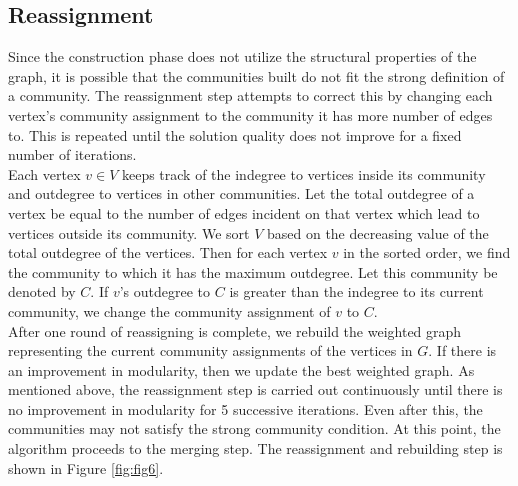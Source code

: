 \begin{spacing}{1.5}
\subsection{Reassignment}
Since the construction phase does not utilize the structural properties of the graph, it is possible that the communities built do not fit the strong definition of a community. The reassignment step attempts to correct this by changing each vertex's community assignment to the community it has more number of edges to. This is repeated until the solution quality does not improve for a fixed number of iterations.\\
\indent Each vertex $v\in V$ keeps track of the indegree to vertices inside its community and outdegree to vertices in other communities. Let the total outdegree of a vertex be equal to the number of edges incident on that vertex which lead to vertices outside its community. We sort $V$ based on the decreasing value of the total outdegree of the vertices. Then for each vertex $v$ in the sorted order, we find the community to which it has the maximum outdegree. Let this community be denoted by $C$. If $v$'s outdegree to $C$ is greater than the indegree to its current community, we change the community assignment of $v$ to $C$.\\
\indent After one round of reassigning is complete, we rebuild the weighted graph representing the current community assignments of the vertices in $G$. If there is an improvement in modularity, then we update the best weighted graph. As mentioned above, the reassignment step is carried out continuously until there is no improvement in modularity for 5 successive iterations. Even after this, the communities may not satisfy the strong community condition. At this point, the algorithm proceeds to the merging step. The reassignment and rebuilding step is shown in Figure \ref{fig:fig6}.\\

\end{spacing}
